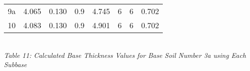 \documentclass{article}
\begin{document}
\begin{center}
\begin{spacing}{1.6}
\begin{tabular}{|c|ccccccc|}
                                            9a & 4.065 & 0.130 & 0.9 & 4.745 & 6 & 6 & 0.702  \\
                                            10 & 4.083 & 0.130 & 0.9 & 4.901 & 6 & 6 & 0.702\\\hline
        \end{tabular}
        \vspace{3mm}
        \emph{\\Table 11: Calculated Base Thickness Values for Base Soil Number 3a using Each Subbase\\}
        \vspace{7mm}



\end{spacing}
\end{center}
\end{document}
